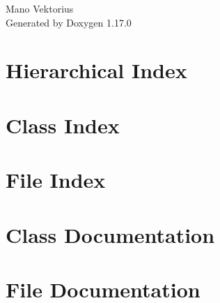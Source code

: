 \documentclass[twoside]{book}
\newcommand{\+}{\discretionary{\mbox{\scriptsize$\hookleftarrow$}}{}{}}
\newcommand{\clearemptydoublepage}{%
    \newpage{\pagestyle{empty}\cleardoublepage}%
  }
\begin{document}
  \raggedbottom
    \hypersetup{pageanchor=false,
                bookmarksnumbered=true,
                pdfencoding=unicode
               }
  \begin{titlepage}
  \vspace*{7cm}
  \begin{center}%
  {\Large Mano Vektorius}\\
  \vspace*{1cm}
  {\large Generated by Doxygen 1.17.0}\\
  \end{center}
  \end{titlepage}
  \clearemptydoublepage
  \tableofcontents
  \clearemptydoublepage
  \hypersetup{pageanchor=true}

\chapter{Hierarchical Index}

\chapter{Class Index}

\chapter{File Index}

\chapter{Class Documentation}




\chapter{File Documentation}







  \backmatter
  \newpage
  \clearemptydoublepage
  \printindex
\end{document}
